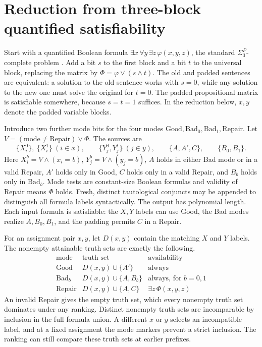 \documentclass[11pt,a4paper]{amsart}
\newcommand{\Good}{\mathrm{Good}}
\newcommand{\Bad}{\mathrm{Bad}}
\newcommand{\Repair}{\mathrm{Repair}}
\newcommand{\mode}{\mathrm{mode}}
\begin{document}
\section{Reduction from three-block quantified satisfiability}
Start with a quantified Boolean formula $\exists x\,\forall y\,\exists z\,\varphi(x,y,z)$, the standard $\Sigma_3^P$-complete problem \cite{stockmeyer}. Add a bit $s$ to the first block and a bit $t$ to the universal block, replacing the matrix by $\Phi=\varphi\vee(s\wedge t)$. The old and padded sentences are equivalent: a solution to the old sentence works with $s=0$, while any solution to the new one must solve the original for $t=0$. The padded propositional matrix is satisfiable somewhere, because $s=t=1$ suffices. In the reduction below, $x,y$ denote the padded variable blocks.

Introduce two further mode bits for the four modes $\Good,\Bad_0,\Bad_1,\Repair$. Let $V=(\mode\ne\Repair)\vee\Phi$. The sources are
\[
 \{X_i^0\},\ \{X_i^1\}\ (i\in x),\qquad
 \{Y_j^0,Y_j^1\}\ (j\in y),\qquad
 \{A,A',C\},\qquad\{B_0,B_1\}.
\]
Here $X_i^b=V\wedge(x_i=b)$, $Y_j^b=V\wedge(y_j=b)$, $A$ holds in either Bad mode or in a valid Repair, $A'$ holds only in Good, $C$ holds only in a valid Repair, and $B_b$ holds only in $\Bad_b$. Mode tests are constant-size Boolean formulas and validity of Repair means $\Phi$ holds. Fresh, distinct tautological conjuncts may be appended to distinguish all formula labels syntactically. The output has polynomial length. Each input formula is satisfiable: the $X,Y$ labels can use Good, the Bad modes realize $A,B_0,B_1$, and the padding permits $C$ in a Repair.

For an assignment pair $x,y$, let $D(x,y)$ contain the matching $X$ and $Y$ labels. The nonempty attainable truth sets are exactly the following.
\[
\begin{array}{c|l|l}
 \text{mode}&\text{truth set}&\text{availability}\\ \hline
 \Good & D(x,y)\cup\{A'\} & \text{always}\\
 \Bad_b & D(x,y)\cup\{A,B_b\} & \text{always, for }b=0,1\\
 \Repair & D(x,y)\cup\{A,C\} & \exists z\,\Phi(x,y,z)
\end{array}
\]
An invalid Repair gives the empty truth set, which every nonempty truth set dominates under any ranking. Distinct nonempty truth sets are incomparable by inclusion in the full formula union. A different $x$ or $y$ selects an incompatible label, and at a fixed assignment the mode markers prevent a strict inclusion. The ranking can still compare these truth sets at earlier prefixes.
\end{document}
